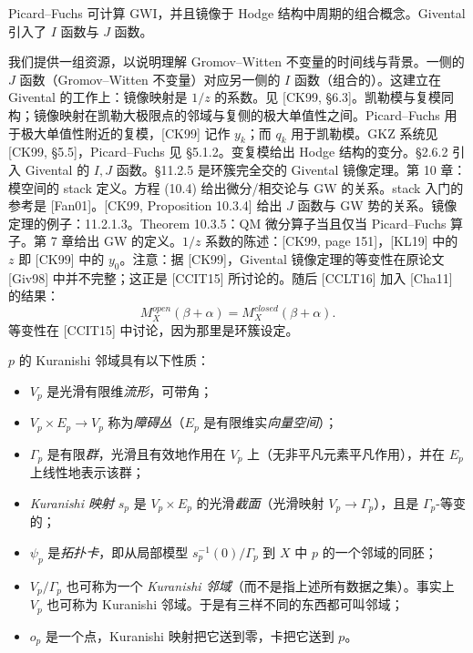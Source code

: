 \begin{lemma}[Givental]\label{lem:givental}
Picard--Fuchs 可计算 GWI，并且镜像于 Hodge 结构中周期的组合概念。Givental 引入了 $I$ 函数与 $J$ 函数。
\end{lemma}

\begin{remark}[闭镜像定理：{[CCIT15]}]\label{rem:closed-mirror}
我们提供一组资源，以说明理解 Gromov--Witten 不变量的时间线与背景。一侧的 $J$ 函数（Gromov--Witten 不变量）对应另一侧的 $I$ 函数（组合的）。这建立在 Givental 的工作上：镜像映射是 $1/z$ 的系数。见 [CK99, §6.3]。凯勒模与复模同构；镜像映射在凯勒大极限点的邻域与复侧的极大单值性之间。Picard--Fuchs 用于极大单值性附近的复模，[CK99] 记作 $y_k$；而 $q_k$ 用于凯勒模。GKZ 系统见 [CK99, §5.5]，Picard--Fuchs 见 §5.1.2。变复模给出 Hodge 结构的变分。§2.6.2 引入 Givental 的 $I,J$ 函数。§11.2.5 是环簇完全交的 Givental 镜像定理。第 10 章：模空间的 stack 定义。方程 (10.4) 给出微分/相交论与 GW 的关系。stack 入门的参考是 [Fan01]。[CK99, Proposition 10.3.4] 给出 $J$ 函数与 GW 势的关系。镜像定理的例子：11.2.1.3。Theorem 10.3.5：QM 微分算子当且仅当 Picard--Fuchs 算子。第 7 章给出 GW 的定义。$1/z$ 系数的陈述：[CK99, page 151]，[KL19] 中的 $z$ 即 [CK99] 中的 $y_0$。注意：据 [CK99]，Givental 镜像定理的等变性在原论文 [Giv98] 中并不完整；这正是 [CCIT15] 所讨论的。随后 [CCLT16] 加入 [Cha11] 的结果：
\[
M_X^{open}(\beta+\alpha)=M_X^{closed}(\beta+\alpha).
\]
等变性在 [CCIT15] 中讨论，因为那里是环簇设定。
\end{remark}

\begin{definition}[Kuranishi 结构]\label{def:kuranishi}
$p$ 的 Kuranishi 邻域具有以下性质：
\begin{itemize}[leftmargin=2.2em,itemsep=0.25em]
\item $V_p$ 是光滑有限维\emph{流形}，可带角；
\item $V_p\times E_p\to V_p$ 称为\emph{障碍丛}（$E_p$ 是有限维实\emph{向量空间}）；
\item $\Gamma_p$ 是有限\emph{群}，光滑且有效地作用在 $V_p$ 上（无非平凡元素平凡作用），并在 $E_p$ 上线性地表示该群；
\item \emph{Kuranishi 映射} $s_p$ 是 $V_p\times E_p$ 的光滑\emph{截面}（光滑映射 $V_p\to\Gamma_p$），且是 $\Gamma_p$-等变的；
\item $\psi_p$ 是\emph{拓扑卡}，即从局部模型 $s_p^{-1}(0)/\Gamma_p$ 到 $X$ 中 $p$ 的一个邻域的同胚；
\item $V_p/\Gamma_p$ 也可称为一个 \emph{Kuranishi 邻域}（而不是指上述所有数据之集）。事实上 $V_p$ 也可称为 Kuranishi 邻域。于是有三样不同的东西都可叫邻域；
\item $o_p$ 是一个点，Kuranishi 映射把它送到零，卡把它送到 $p$。
\end{itemize}
\end{definition}

